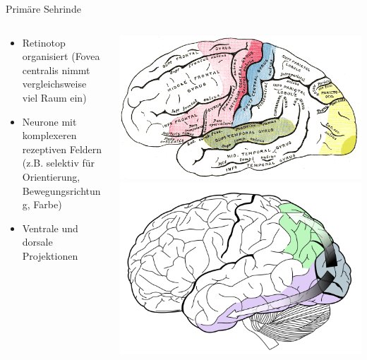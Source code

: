 \documentclass{beamer}
\begin{document}

\begin{frame}{Primäre Sehrinde}

\begin{columns}[c]

\begin{column}{6cm}
\begin{itemize}
    \item 
    Retinotop organisiert (Fovea centralis nimmt vergleichsweise viel Raum ein)
    \item
    Neurone mit komplexeren rezeptiven Feldern (z.B. selektiv für Orientierung, Bewegungsrichtung, Farbe)
    \item
    Ventrale und dorsale Projektionen
\end{itemize}

\end{column}

\begin{column}{5cm}
\includegraphics[width=\textwidth]{Gray756.png}
\pause
\includegraphics[width=\textwidth]{Ventral-dorsal_streams.png}
\end{column}


\end{columns}
    
\end{frame}
    
\end{document}
